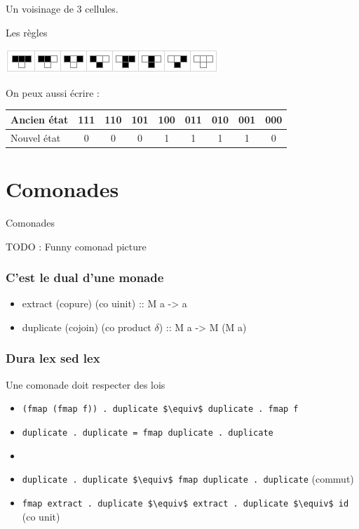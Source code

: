 \documentclass{beamer}
\begin{document}
\begin{frame}
\begin{block}{}
	Un voisinage de 3 cellules.
\end{block}
\pause
\begin{block}{Les règles}
	\begin{center}
	\includegraphics[scale=1]{rule30_rule.png}
	\end{center}
\end{block}
\pause
\begin{block}{On peux aussi écrire :}
	\begin{center}
	\begin{tabular}{|l|c|c|c|c|c|c|c|c|}
	\hline
	Ancien état & 111 & 110 & 101 & 100 & 011 & 010 & 001 & 000 \\
	\hline
	Nouvel état	& 0   & 0   & 0   & 1   & 1   & 1   & 1   & 0 \\
	\hline
	\end{tabular}
	\end{center}
\end{block}
\end{frame}

\section{Comonades}

\begin{frame}
Comonades

TODO : Funny comonad picture
\end{frame}

\begin{frame}
\frametitle{C'est le dual d'une monade}

\begin{itemize}
\item extract (copure) (co uinit) :: M a -> a
\item duplicate (cojoin) (co product $\delta$) :: M a -> M (M a)
\end{itemize}
\end{frame}

\begin{frame}
\frametitle{Dura lex sed lex}
\begin{alertblock}{Une comonade doit respecter des lois}
\begin{itemize}
\item \verb!(fmap (fmap f)) . duplicate $\equiv$ duplicate . fmap f!
\item \verb!duplicate . duplicate = fmap duplicate . duplicate!
\item[] \ 
\item \verb!duplicate . duplicate $\equiv$ fmap duplicate . duplicate! (commut)
\item \verb!fmap extract . duplicate $\equiv$ extract . duplicate $\equiv$ id! (co unit)
\end{itemize}
\end{alertblock}
\end{frame}
\end{document}
